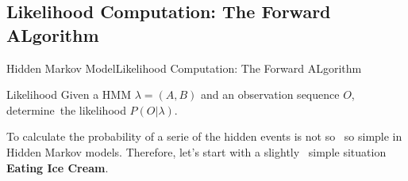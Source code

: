 \documentclass[10pt]{beamer}
\begin{document}
\subsection{Likelihood Computation: The Forward ALgorithm}
\begin{frame}{Hidden Markov Model}{Likelihood Computation: The Forward ALgorithm}
   \begin{block}{Likelihood}
       Given a HMM $\lambda=(A,B)$ and an observation sequence $O$, determine\
       the likelihood $P(O|\lambda)$.
   \end{block}
   To calculate the probability of a serie of the hidden events is not so \
   so simple in Hidden Markov models. Therefore, let's start with a slightly \
   simple situation \textbf{Eating Ice Cream}.

\end{frame}
\end{document}
